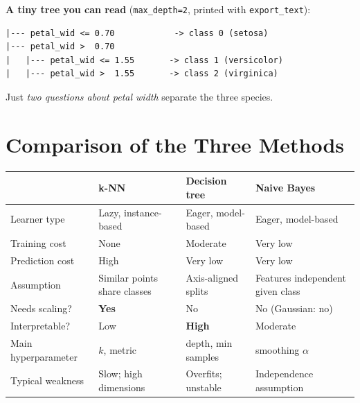 \begin{tryit}
\medskip\noindent\textbf{A tiny tree you can read} (\texttt{max\_depth=2}, printed with \texttt{export\_text}):
\begin{lstlisting}[numbers=none]
|--- petal_wid <= 0.70            -> class 0 (setosa)
|--- petal_wid >  0.70
|   |--- petal_wid <= 1.55       -> class 1 (versicolor)
|   |--- petal_wid >  1.55       -> class 2 (virginica)
\end{lstlisting}
Just \emph{two questions about petal width} separate the three species.
\end{tryit}

\section{Comparison of the Three Methods}

\begin{center}
\small
\begin{tabular}{@{}p{3.1cm}p{3.5cm}p{3.5cm}p{3.5cm}@{}}
\toprule
 & \textbf{k-NN} & \textbf{Decision tree} & \textbf{Naive Bayes}\\
\midrule
Learner type & Lazy, instance-based & Eager, model-based & Eager, model-based\\
Training cost & None & Moderate & Very low\\
Prediction cost & High & Very low & Very low\\
Assumption & Similar points share classes & Axis-aligned splits & Features independent given class\\
Needs scaling? & \textbf{Yes} & No & No (Gaussian: no)\\
Interpretable? & Low & \textbf{High} & Moderate\\
Main hyperparameter & $k$, metric & depth, min samples & smoothing $\alpha$\\
Typical weakness & Slow; high dimensions & Overfits; unstable & Independence assumption\\
\bottomrule
\end{tabular}
\end{center}


